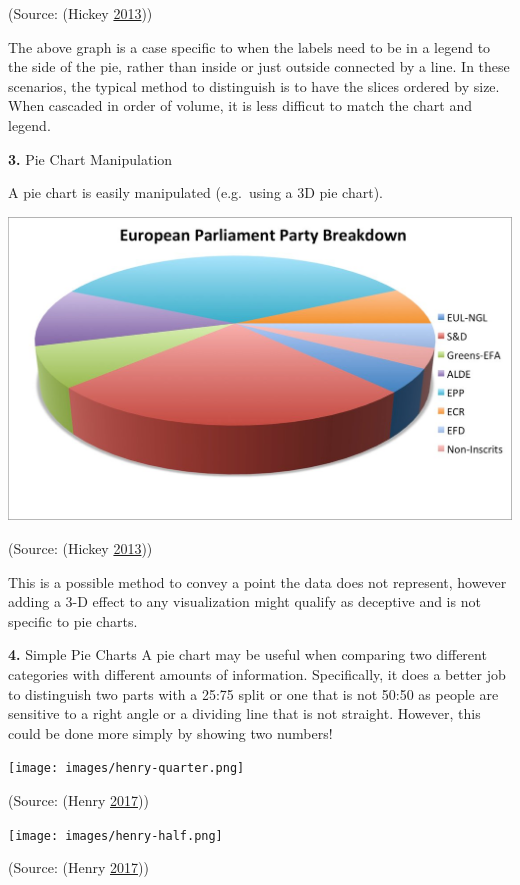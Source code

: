 \documentclass[]{book}
\begin{document}
(Source: (Hickey \protect\hyperlink{ref-hickey-pie-worst}{2013}))

The above graph is a case specific to when the labels need to be in a legend to the side of the pie, rather than inside or just outside connected by a line. In these scenarios, the typical method to distinguish is to have the slices ordered by size. When cascaded in order of volume, it is less difficut to match the chart and legend.

\textbf{3.} Pie Chart Manipulation

A pie chart is easily manipulated (e.g.~using a 3D pie chart).

\includegraphics{images/hickey-3D.jpg}

(Source: (Hickey \protect\hyperlink{ref-hickey-pie-worst}{2013}))

This is a possible method to convey a point the data does not represent, however adding a 3-D effect to any visualization might qualify as deceptive and is not specific to pie charts.

\textbf{4.} Simple Pie Charts
A pie chart may be useful when comparing two different categories with different amounts of information. Specifically, it does a better job to distinguish two parts with a 25:75 split or one that is not 50:50 as people are sensitive to a right angle or a dividing line that is not straight. However, this could be done more simply by showing two numbers!

\texttt{[image: images/henry-quarter.png]}

(Source: (Henry \protect\hyperlink{ref-henry-defense-pie}{2017}))

\texttt{[image: images/henry-half.png]}

(Source: (Henry \protect\hyperlink{ref-henry-defense-pie}{2017}))
\end{document}
